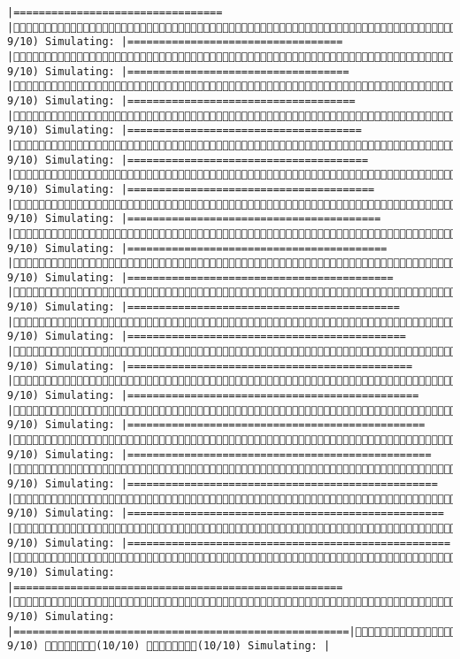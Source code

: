 \documentclass[]{article}
\begin{document}
\begin{verbatim}
|=================================                    |( 9/10) Simulating: |==================================                   |( 9/10) Simulating: |===================================                  |( 9/10) Simulating: |====================================                 |( 9/10) Simulating: |=====================================                |( 9/10) Simulating: |======================================               |( 9/10) Simulating: |=======================================              |( 9/10) Simulating: |========================================             |( 9/10) Simulating: |=========================================            |( 9/10) Simulating: |==========================================           |( 9/10) Simulating: |===========================================          |( 9/10) Simulating: |============================================         |( 9/10) Simulating: |=============================================        |( 9/10) Simulating: |==============================================       |( 9/10) Simulating: |===============================================      |( 9/10) Simulating: |================================================     |( 9/10) Simulating: |=================================================    |( 9/10) Simulating: |==================================================   |( 9/10) Simulating: |===================================================  |( 9/10) Simulating: |==================================================== |( 9/10) Simulating: |=====================================================|( 9/10) (10/10) (10/10) Simulating: |                                                     
\end{verbatim}
\end{document}
